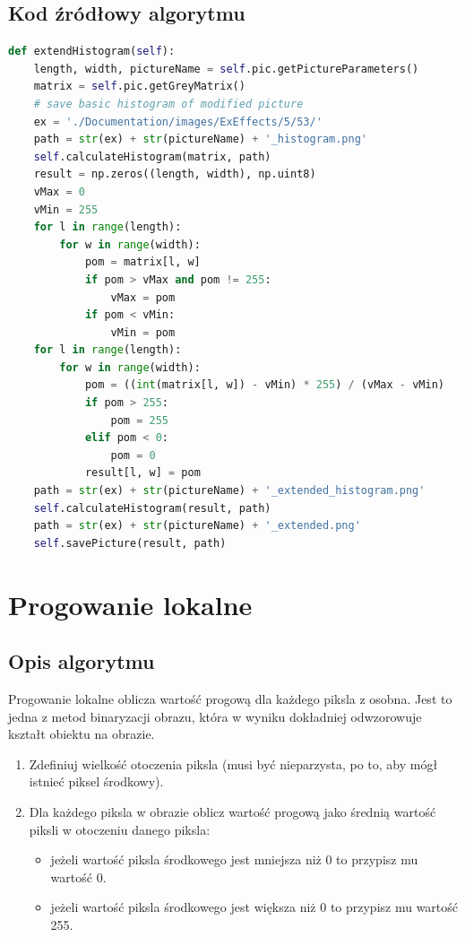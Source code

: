 \documentclass[a4paper,12pt, titlepage]{report}
\begin{document}
\subsection*{Kod źródłowy algorytmu}
\begin{lstlisting}[language=Python]
def extendHistogram(self):
    length, width, pictureName = self.pic.getPictureParameters()
    matrix = self.pic.getGreyMatrix()
    # save basic histogram of modified picture
    ex = './Documentation/images/ExEffects/5/53/'
    path = str(ex) + str(pictureName) + '_histogram.png'
    self.calculateHistogram(matrix, path)
    result = np.zeros((length, width), np.uint8)
    vMax = 0
    vMin = 255
    for l in range(length):
        for w in range(width):
            pom = matrix[l, w]
            if pom > vMax and pom != 255:
                vMax = pom
            if pom < vMin:
                vMin = pom
    for l in range(length):
        for w in range(width):
            pom = ((int(matrix[l, w]) - vMin) * 255) / (vMax - vMin)
            if pom > 255:
                pom = 255
            elif pom < 0:
                pom = 0
            result[l, w] = pom
    path = str(ex) + str(pictureName) + '_extended_histogram.png'
    self.calculateHistogram(result, path)
    path = str(ex) + str(pictureName) + '_extended.png'
    self.savePicture(result, path)
\end{lstlisting}

\section{Progowanie lokalne}
\subsection*{Opis algorytmu}
\par Progowanie lokalne oblicza wartość progową dla każdego piksla z osobna. Jest to jedna z metod binaryzacji obrazu, która w wyniku dokładniej odwzorowuje kształt obiektu na obrazie.
\begin{enumerate}
\item Zdeﬁniuj wielkość otoczenia piksla (musi być nieparzysta, po to, aby mógł istnieć piksel środkowy).
\item Dla każdego piksla w obrazie oblicz wartość progową jako średnią wartość piksli w otoczeniu danego piksla:
\begin{itemize}
\item jeżeli wartość piksla środkowego jest mniejsza niż 0 to przypisz mu wartość 0.
\item jeżeli wartość piksla środkowego jest większa niż 0 to przypisz mu wartość 255. 
\end{itemize}
\end{enumerate}
\end{document}
